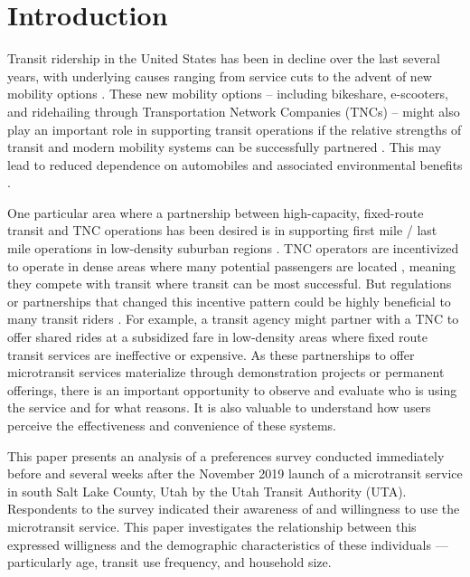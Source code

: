 \documentclass[smartcities,article,submit,moreauthors,pdftex]{Definitions/mdpi}
\begin{document}

\section{Introduction}

Transit ridership in the United States has been in decline over the last several years, with underlying causes ranging from service cuts to the advent of new mobility options \citep{Graehler2019, Mallett2018}. These new mobility options -- including bikeshare, e-scooters, and ridehailing through Transportation Network Companies (TNCs) -- might also play an important role in supporting transit operations if the relative strengths of transit and modern mobility systems can be successfully partnered \citep{Shaheen2016, OOSTENDORP201872, ShivThesis}. This may lead to reduced dependence on automobiles and associated environmental benefits \citep{hoehne2017greenhouse}.

One particular area where a partnership between high-capacity, fixed-route transit and TNC operations has been desired is in supporting first mile / last mile operations in low-density suburban regions \citep{Shaheen2016, alonso2018, Kang2020}. TNC operators are incentivized to operate in dense areas where many potential passengers are located \citep{Wong2020}, meaning they compete with transit where transit can be most successful. But regulations or partnerships that changed this incentive pattern could be highly beneficial to many transit riders \citep{Ronald2017, Deakin2010}. For example, a transit agency might partner with a TNC to offer shared rides at a subsidized fare in low-density areas where fixed route transit services are ineffective or expensive. As these partnerships to offer microtransit services materialize through demonstration projects or permanent offerings, there is an important opportunity to observe and evaluate who is using the service and for what reasons. It is also valuable to understand how users perceive the effectiveness and convenience of these systems.

This paper presents an analysis of a preferences survey conducted immediately before and several weeks after the November 2019 launch of a microtransit service in south Salt Lake County, Utah by the Utah Transit Authority (UTA). Respondents to the survey indicated their awareness of and willingness to use the microtransit service.  This paper investigates the relationship between this expressed willigness and the demographic characteristics of these individuals --- particularly age, transit use frequency, and household size.
\end{document}

